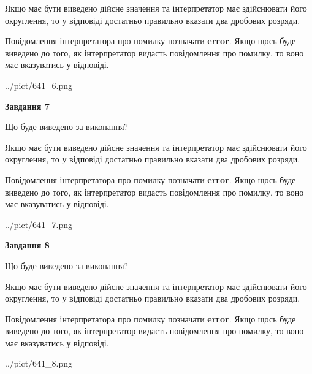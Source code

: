 \documentclass[12pt, ukrainian]{article}
\begin{document}
{\begin {Large}
Якщо має бути виведено дійсне значення та інтерпретатор має здійснювати його округлення, 
то у відповіді достатньо правильно вказати два дробових розряди.

Повідомлення інтерпретатора про помилку позначати \textbf{error}.
Якщо щось буде виведено до того, як інтерпретатор видасть повідомлення про помилку, 
то воно має вказуватись у відповіді. \par

\begin{center}
	{../pict/641_6.png}
\end{center}
\newpage

{\begin {center}\textbf{Завдання 7}\end {center}}\par
Що буде виведено за виконання? \par

Якщо має бути виведено дійсне значення та інтерпретатор має здійснювати його округлення, 
то у відповіді достатньо правильно вказати два дробових розряди.

Повідомлення інтерпретатора про помилку позначати \textbf{error}.
Якщо щось буде виведено до того, як інтерпретатор видасть повідомлення про помилку, 
то воно має вказуватись у відповіді. \par

\begin{center}
	{../pict/641_7.png}
\end{center}
\newpage

{\begin {center}\textbf{Завдання 8}\end {center}}\par
Що буде виведено за виконання? \par

Якщо має бути виведено дійсне значення та інтерпретатор має здійснювати його округлення, 
то у відповіді достатньо правильно вказати два дробових розряди.

Повідомлення інтерпретатора про помилку позначати \textbf{error}.
Якщо щось буде виведено до того, як інтерпретатор видасть повідомлення про помилку, 
то воно має вказуватись у відповіді. \par

\begin{center}
	{../pict/641_8.png}
\end{center}
\newpage


\end{Large}}
\end{document}
